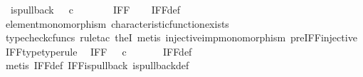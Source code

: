 \begin{isabellebody}
\ \ {\isachardoublequoteopen}is{\isacharunderscore}{\kern0pt}pullback\ {\isacharparenleft}{\kern0pt}{\isasymone}{\isasymCoprod}{\isasymone}{\isacharparenright}{\kern0pt}\ {\isasymone}\ {\isacharparenleft}{\kern0pt}{\isasymOmega}{\isasymtimes}\isactrlsub c{\isasymOmega}{\isacharparenright}{\kern0pt}\ {\isasymOmega}\ {\isacharparenleft}{\kern0pt}{\isasymbeta}\isactrlbsub {\isacharparenleft}{\kern0pt}{\isasymone}{\isasymCoprod}{\isasymone}{\isacharparenright}{\kern0pt}\isactrlesub {\isacharparenright}{\kern0pt}\ {\isasymt}\ {\isacharparenleft}{\kern0pt}{\isasymlangle}{\isasymt}{\isacharcomma}{\kern0pt}\ {\isasymt}{\isasymrangle}\ {\isasymamalg}{\isasymlangle}{\isasymf}{\isacharcomma}{\kern0pt}\ {\isasymf}{\isasymrangle}{\isacharparenright}{\kern0pt}\ IFF{\isachardoublequoteclose}\isanewline
%
\isadelimproof
\ \ %
\endisadelimproof
%
\isatagproof
{}\isamarkupfalse%
\ IFF{\isacharunderscore}{\kern0pt}def\isanewline
\ \ \isamarkupfalse%
\ element{\isacharunderscore}{\kern0pt}monomorphism\ characteristic{\isacharunderscore}{\kern0pt}function{\isacharunderscore}{\kern0pt}exists\isanewline
\ \ \isamarkupfalse%
\ {\isacharparenleft}{\kern0pt}typecheck{\isacharunderscore}{\kern0pt}cfuncs{\isacharcomma}{\kern0pt}\ rule{\isacharunderscore}{\kern0pt}tac\ the{}I{}{\isacharcomma}{\kern0pt}\ metis\ injective{\isacharunderscore}{\kern0pt}imp{\isacharunderscore}{\kern0pt}monomorphism\ pre{\isacharunderscore}{\kern0pt}IFF{\isacharunderscore}{\kern0pt}injective{\isacharparenright}{\kern0pt}%
\endisatagproof
{\isafoldproof}%
%
\isadelimproof
\isanewline
%
\endisadelimproof
\isanewline
{}\isamarkupfalse%
\ IFF{\isacharunderscore}{\kern0pt}type{\isacharbrackleft}{\kern0pt}type{\isacharunderscore}{\kern0pt}rule{\isacharbrackright}{\kern0pt}{\isacharcolon}{\kern0pt}\isanewline
\ \ {\isachardoublequoteopen}IFF\ {\isacharcolon}{\kern0pt}\ {\isasymOmega}\ {\isasymtimes}\isactrlsub c\ {\isasymOmega}\ {\isasymrightarrow}\ {\isasymOmega}{\isachardoublequoteclose}\isanewline
%
\isadelimproof
\ \ %
\endisadelimproof
%
\isatagproof
{}\isamarkupfalse%
\ IFF{\isacharunderscore}{\kern0pt}def\isanewline
\ \ \isamarkupfalse%
\ {\isacharparenleft}{\kern0pt}metis\ IFF{\isacharunderscore}{\kern0pt}def\ IFF{\isacharunderscore}{\kern0pt}is{\isacharunderscore}{\kern0pt}pullback\ is{\isacharunderscore}{\kern0pt}pullback{\isacharunderscore}{\kern0pt}def{\isacharparenright}{\kern0pt}%
\endisatagproof
{\isafoldproof}%
%
\isadelimproof
\isanewline
%
\endisadelimproof
\isanewline

\end{isabellebody}
